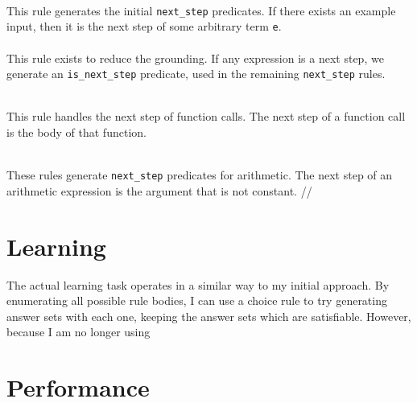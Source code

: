  
\mbox{} \\
This rule generates the initial \lstinline{next_step} predicates. If there exists an example input, then it is the next step of some arbitrary term \lstinline{e}. \\

 
\mbox{} \\
This rule exists to reduce the grounding. If any expression is a next step, we generate an \lstinline{is_next_step} predicate, used in the remaining \lstinline{next_step} rules.

 
\mbox{} \\
This rule handles the next step of function calls. The next step of a function call is the body of that function.

 
\mbox{} \\
These rules generate \lstinline{next_step} predicates for arithmetic. The next step of an arithmetic expression is the argument that is not constant. //%

\section{Learning}
The actual learning task operates in a similar way to my initial approach. By enumerating all possible rule bodies, I can use a choice rule to try generating answer sets with each one, keeping the answer sets which are satisfiable. However, because I am no longer using 


\section{Performance}



\pagebreak
%
%